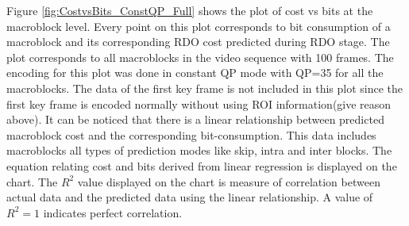 \documentclass[11pt]{article} %
\begin{document}
Figure \ref{fig:CostvsBits_ConstQP_Full} shows the plot of cost vs bits at the macroblock level. Every point on this plot corresponds to bit consumption of a macroblock and its corresponding RDO cost predicted during RDO stage. The plot corresponds to all macroblocks in the video sequence with 100 frames. The encoding for this plot was done in constant QP mode with QP=35 for all the macroblocks. The data of the first key frame is not included in this plot since the first key frame is encoded normally without using ROI information(give reason above). It can be noticed that there is a linear relationship between predicted macroblock cost and the corresponding bit-consumption. This data includes macroblocks all types of prediction modes like skip, intra and inter blocks. The equation relating cost and bits derived from linear regression is displayed on the chart. The $R^2$ value displayed on the chart is measure of correlation between actual data and the predicted data using the linear relationship. A value of $R^2 = 1$ indicates perfect correlation.
\end{document}
